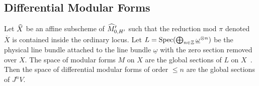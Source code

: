 \documentclass{amsart}
\newcommand{\uomega}{\underline{\omega}}
\newcommand{\ov}[1]{\overline{#1}}
\numberwithin{equation}{section}
\DeclareMathOperator{\Spec}{\mathrm{Spec}}
\begin{document}





\subsection{Differential Modular Forms}
\label{dmf}

Let $\widehat{X}$ be an affine subscheme of ${\widehat{M}}'_{0,H'}$ such that the reduction mod $\pi$ 
denoted $\ov{X}$ is contained inside the ordinary locus. 
Let $L=\Spec (\bigoplus_{n \in \Z} \uomega^{\otimes n})$ 
be the physical line bundle attached to the line bundle $\underline{\omega}$ 
with the zero section removed over $X$.
The space of modular forms $M$ on $X$ are the global sections of 
$L$ on $X$~\cite{MR2027194}. Then the space of differential modular forms
of order $\leq n$ are the global sections of $J^nV$.
\end{document}
